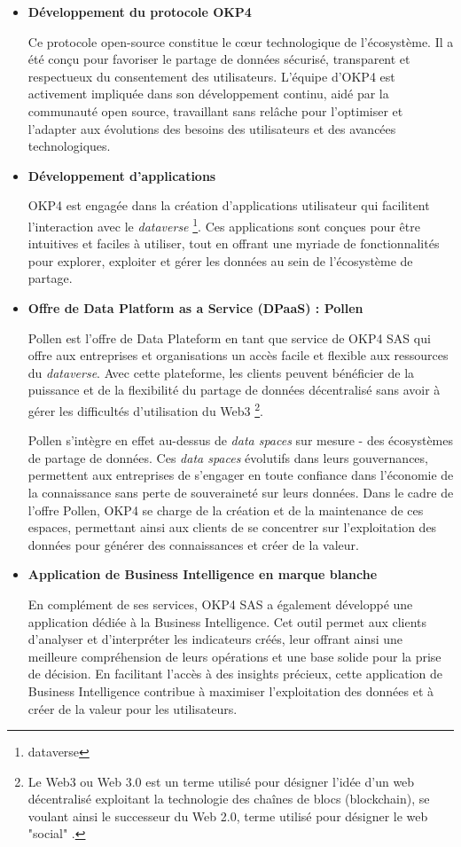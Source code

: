 \begin{itemize}
\item \textbf{Développement du protocole OKP4}

     Ce protocole open-source constitue le cœur technologique de l'écosystème. Il a été conçu pour favoriser le partage de données sécurisé, transparent et respectueux du consentement des utilisateurs. L'équipe d'OKP4 est activement impliquée dans son développement continu, aidé par la communauté open source, travaillant sans relâche pour l'optimiser et l'adapter aux évolutions des besoins des utilisateurs et des avancées technologiques.
     
    \item \textbf{Développement d'applications}
    
    OKP4 est engagée dans la création d'applications utilisateur qui facilitent l'interaction avec le \textit{dataverse} \footnote{dataverse}. Ces applications sont conçues pour être intuitives et faciles à utiliser, tout en offrant une myriade de fonctionnalités pour explorer, exploiter et gérer les données au sein de l'écosystème de partage.
    \item \textbf{Offre de Data Platform as a Service (DPaaS) : Pollen}

    Pollen est l'offre de Data Plateform en tant que service de OKP4 SAS qui offre aux entreprises et organisations un accès facile et flexible aux ressources du \textit{dataverse}. Avec cette plateforme, les clients peuvent bénéficier de la puissance et de la flexibilité du partage de données décentralisé sans avoir à gérer les difficultés d'utilisation du Web3 \footnote{Le Web3 ou Web 3.0 est un terme utilisé pour désigner l'idée d'un web décentralisé exploitant la technologie des chaînes de blocs (blockchain), se voulant ainsi le successeur du Web 2.0, terme utilisé pour désigner le web "social" .}. 

    Pollen s'intègre en effet au-dessus de \textit{data spaces} sur mesure - des écosystèmes de partage de données. Ces \textit{data spaces} évolutifs dans leurs gouvernances, permettent aux entreprises de s'engager en toute confiance dans l'économie de la connaissance sans perte de souveraineté sur leurs données. Dans le cadre de l'offre Pollen, OKP4 se charge de la création et de la maintenance de ces espaces, permettant ainsi aux clients de se concentrer sur l'exploitation des données pour générer des connaissances et créer de la valeur.
    

    \item \textbf{Application de Business Intelligence en marque blanche}

En complément de ses services, OKP4 SAS a également développé une application dédiée à la Business Intelligence. Cet outil permet aux clients d'analyser et d'interpréter les indicateurs créés, leur offrant ainsi une meilleure compréhension de leurs opérations et une base solide pour la prise de décision. En facilitant l'accès à des insights précieux, cette application de Business Intelligence contribue à maximiser l'exploitation des données et à créer de la valeur pour les utilisateurs.

\end{itemize}

\newpage
